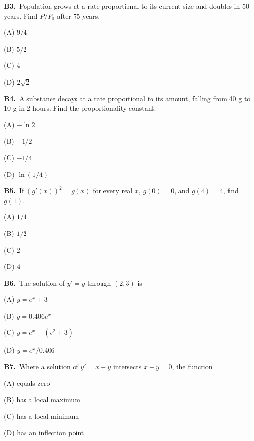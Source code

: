 \documentclass[11pt]{article}
\begin{document}
\bigskip\noindent\textbf{B3.}\ Population grows at a rate proportional to its current size and doubles in 50 years. Find $P/P_0$ after 75 years.
\begin{list}{}{\setlength{\leftmargin}{3em}\setlength{\labelwidth}{2.5em}\setlength{\itemsep}{0pt}\setlength{\topsep}{2pt}}
\item[(A)] $9/4$
\item[(B)] $5/2$
\item[(C)] $4$
\item[(D)] $2\sqrt2$
\end{list}

\bigskip\noindent\textbf{B4.}\ A substance decays at a rate proportional to its amount, falling from 40 g to 10 g in 2 hours. Find the proportionality constant.
\begin{list}{}{\setlength{\leftmargin}{3em}\setlength{\labelwidth}{2.5em}\setlength{\itemsep}{0pt}\setlength{\topsep}{2pt}}
\item[(A)] $-\ln2$
\item[(B)] $-1/2$
\item[(C)] $-1/4$
\item[(D)] $\ln(1/4)$
\end{list}

\bigskip\noindent\textbf{B5.}\ If $(g'(x))^2=g(x)$ for every real $x$, $g(0)=0$, and $g(4)=4$, find $g(1)$.
\begin{list}{}{\setlength{\leftmargin}{3em}\setlength{\labelwidth}{2.5em}\setlength{\itemsep}{0pt}\setlength{\topsep}{2pt}}
\item[(A)] $1/4$
\item[(B)] $1/2$
\item[(C)] $2$
\item[(D)] $4$
\end{list}

\bigskip\noindent\textbf{B6.}\ The solution of $y'=y$ through $(2,3)$ is
\begin{list}{}{\setlength{\leftmargin}{3em}\setlength{\labelwidth}{2.5em}\setlength{\itemsep}{0pt}\setlength{\topsep}{2pt}}
\item[(A)] $y=e^x+3$
\item[(B)] $y=0.406e^x$
\item[(C)] $y=e^x-(e^2+3)$
\item[(D)] $y=e^x/0.406$
\end{list}

\bigskip\noindent\textbf{B7.}\ Where a solution of $y'=x+y$ intersects $x+y=0$, the function
\begin{list}{}{\setlength{\leftmargin}{3em}\setlength{\labelwidth}{2.5em}\setlength{\itemsep}{0pt}\setlength{\topsep}{2pt}}
\item[(A)] equals zero
\item[(B)] has a local maximum
\item[(C)] has a local minimum
\item[(D)] has an inflection point
\end{list}
\end{document}
